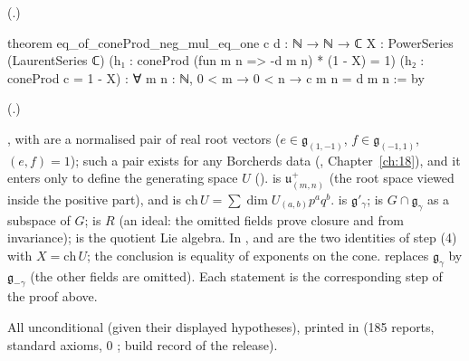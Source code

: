 (.)
\begin{leancode}
theorem eq_of_coneProd_neg_mul_eq_one {c d : ℕ → ℕ → ℂ} {X : PowerSeries (LaurentSeries ℂ)}
    (h₁ : coneProd (fun m n => -d m n) * (1 - X) = 1) (h₂ : coneProd c = 1 - X) :
    ∀ m n : ℕ, 0 < m → 0 < n → c m n = d m n := by
\end{leancode}
(.)
\begin{dictionary}
,  with  are a normalised pair of real root vectors ($e\in\mathfrak g_{(1,-1)}$,
$f\in\mathfrak g_{(-1,1)}$, $(e,f)=1$); such a pair exists for any Borcherds data (,
Chapter~\ref{ch:18}), and it enters only to define the generating space $U$ ().
 is $\mathfrak u^+_{(m,n)}$ (the root space viewed inside the positive part), and
 is $\mathrm{ch}\,U=\sum\dim U_{(a,b)}p^aq^b$.   is
$\mathfrak g'_\gamma$;  is $G\cap\mathfrak g_\gamma$ as a subspace of $G$;  is $R$
(an ideal: the omitted fields prove closure and  from invariance);  is the quotient Lie algebra.  In
,  and  are the two identities of step (4) with
$X=\mathrm{ch}\,U$; the conclusion is equality of exponents on the cone.   replaces $\mathfrak g_\gamma$ by
$\mathfrak g_{-\gamma}$ (the other fields are omitted).  Each statement is the corresponding step of the proof above.
\end{dictionary}
\begin{status}
All unconditional (given their displayed hypotheses), printed in 
(185 reports, standard axioms, 0 ; build record of the release).
\end{status}

